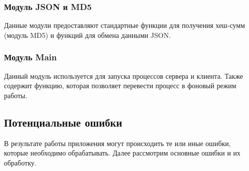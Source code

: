\subsubsection*{Модуль JSON и MD5}
Данные модули предоставляют стандартные функции для получения хеш-сумм
(модуль MD5) и функций для обмена данными JSON.

\subsubsection*{Модуль Main}
Данный модуль используется для запуска процессов сервера и клиента.
Также содержит функцию, которая позволяет перевести процесс в фоновый
режим работы.

\subsection{Потенциальные ошибки}
В результате работы приложения могут происходить те или иные ошибки,
которые необходимо обрабатывать. Далее рассмотрим основные ошибки и
их обработку.
